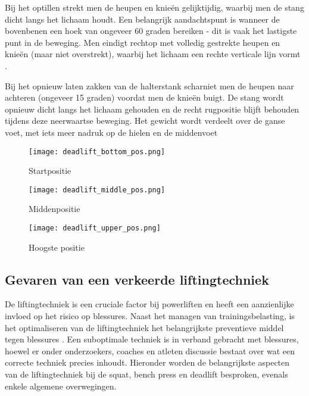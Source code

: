 \medskip

Bij het optillen strekt men de heupen en knieën gelijktijdig, waarbij men de stang dicht langs het lichaam houdt. 
Een belangrijk aandachtspunt is wanneer de bovenbenen een hoek van ongeveer 60 graden bereiken - dit is vaak het lastigste punt in de beweging. 
Men eindigt rechtop met volledig gestrekte heupen en knieën (maar niet overstrekt), waarbij het lichaam een rechte verticale lijn vormt \autocite{Ronai2020}.

\medskip

Bij het opnieuw laten zakken van de halterstank scharniet men de heupen naar achteren (ongeveer 15 graden) voordat men de knieën buigt.
De stang wordt opnieuw dicht langs het lichaam gehouden en de recht rugpositie blijft behouden tijdens deze neerwaartse beweging.
Het gewicht wordt verdeelt over de ganse voet, met iets meer nadruk op de hielen en de middenvoet \autocite{Ronai2020}

\begin{figure}[h]
  \centering
  \begin{minipage}[t]{0.32\textwidth}
    \centering
    \texttt{[image: deadlift\_bottom\_pos.png]}
    \caption[Figuur 1]{\label{fig:deadlift_startpositie} Startpositie \autocite{Ronai2020}}
  \end{minipage}
  \hfill
  \begin{minipage}[t]{0.32\textwidth}
    \centering
    \texttt{[image: deadlift\_middle\_pos.png]}
    \caption[Figuur 2]{\label{fig:deadlift_middenpositie} Middenpositie \autocite{Ronai2020}}
  \end{minipage}
  \hfill
  \begin{minipage}[t]{0.32\textwidth}
    \centering
    \texttt{[image: deadlift\_upper\_pos.png]}
    \caption[Figuur 3]{\label{fig:deadlift_bovenpositie} Hoogste positie \autocite{Ronai2020}}
  \end{minipage}
\end{figure}

\subsection{Gevaren van een verkeerde liftingtechniek}
\label{subsec:gevaren-verkeerde-liftingtechniek}
De liftingtechniek is een cruciale factor bij powerliften en heeft een aanzienlijke invloed op het risico op blessures. 
Naast het managen van trainingsbelasting, is het optimaliseren van de liftingtechniek het belangrijkste preventieve middel tegen blessures \autocite{StrömbäckEtAl2018}. 
Een suboptimale techniek is in verband gebracht met blessures, hoewel er onder onderzoekers, coaches en atleten discussie bestaat over wat een correcte techniek precies inhoudt. 
Hieronder worden de belangrijkste aspecten van de liftingtechniek bij de squat, bench press en deadlift besproken, evenals enkele algemene overwegingen.

